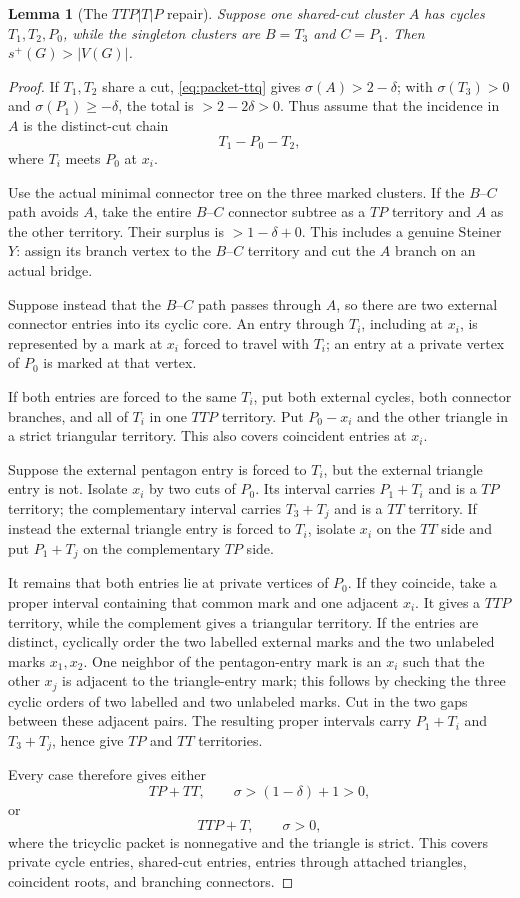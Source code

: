\documentclass[11pt]{article}
\newtheorem{lemma}[theorem]{Lemma}
\newcommand{\spE}{s^+}
\newcommand{\sig}{\sigma}
\begin{document}
\begin{lemma}[The $TTP|T|P$ repair]\label{lem:ttp-t-p}
Suppose one shared-cut cluster $A$ has cycles $T_1,T_2,P_0$, while the
singleton clusters are $B=T_3$ and $C=P_1$.  Then
$\spE(G)>|V(G)|$.
\end{lemma}

\begin{proof}
If $T_1,T_2$ share a cut, \eqref{eq:packet-ttq} gives
$\sig(A)>2-\delta$; with
$\sig(T_3)>0$ and $\sig(P_1)\geq-\delta$, the total is
$>2-2\delta>0$.  Thus assume that the incidence in $A$ is the distinct-cut
chain
\[
 T_1-P_0-T_2,
\]
where $T_i$ meets $P_0$ at $x_i$.

Use the actual minimal connector tree on the three marked clusters.  If the
$B$--$C$ path avoids $A$, take the entire $B$--$C$ connector subtree as a
$TP$ territory and $A$ as the other territory.  Their surplus is
$>1-\delta+0$.  This includes a genuine Steiner $Y$: assign its branch vertex
to the $B$--$C$ territory and cut the $A$ branch on an actual bridge.

Suppose instead that the $B$--$C$ path passes through $A$, so there are two
external connector entries into its cyclic core.  An entry through $T_i$,
including at $x_i$, is represented by a mark at $x_i$ forced to travel with
$T_i$; an entry at a private vertex of $P_0$ is marked at that vertex.

If both entries are forced to the same $T_i$, put both external cycles, both
connector branches, and all of $T_i$ in one $TTP$ territory.  Put $P_0-x_i$
and the other triangle in a strict triangular territory.  This also covers
coincident entries at $x_i$.

Suppose the external pentagon entry is forced to $T_i$, but the external
triangle entry is not.  Isolate $x_i$ by two cuts of $P_0$.  Its interval
carries $P_1+T_i$ and is a $TP$ territory; the complementary interval carries
$T_3+T_j$ and is a $TT$ territory.  If instead the external triangle entry is
forced to $T_i$, isolate $x_i$ on the $TT$ side and put $P_1+T_j$ on the
complementary $TP$ side.

It remains that both entries lie at private vertices of $P_0$.  If they
coincide, take a proper interval containing that common mark and one adjacent
$x_i$.  It gives a $TTP$ territory, while the complement gives a triangular
territory.  If the entries are distinct, cyclically order the two labelled
external marks and the two unlabeled marks $x_1,x_2$.  One neighbor of the
pentagon-entry mark is an $x_i$ such that the other $x_j$ is adjacent to the
triangle-entry mark; this follows by checking the three cyclic orders of two
labelled and two unlabeled marks.  Cut in the two gaps between these adjacent
pairs.  The resulting proper intervals carry $P_1+T_i$ and $T_3+T_j$, hence
give $TP$ and $TT$ territories.

Every case therefore gives either
\[
 TP+TT,\qquad \sig>(1-\delta)+1>0,
\]
or
\[
 TTP+T,\qquad \sig>0,
\]
where the tricyclic packet is nonnegative and the triangle is strict.  This
covers private cycle entries, shared-cut entries, entries through attached
triangles, coincident roots, and branching connectors.
\end{proof}
\end{document}

